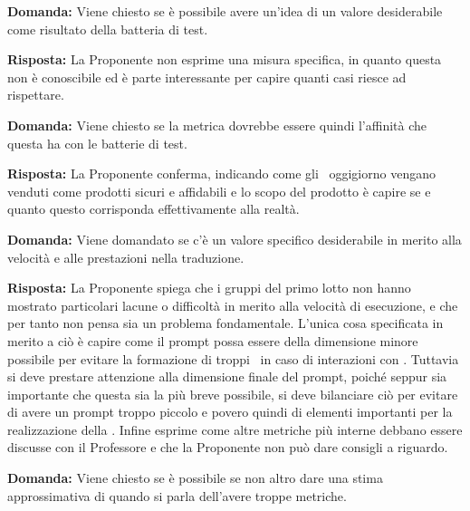 \par \textbf{Domanda:} Viene chiesto se è possibile avere un'idea di un valore desiderabile come risultato della batteria di test.

\par \textbf{Risposta:} La Proponente non esprime una misura specifica, in quanto questa non è conoscibile ed è parte interessante per capire quanti casi riesce ad rispettare.

\par \textbf{Domanda:} Viene chiesto se la metrica dovrebbe essere quindi l'affinità che questa ha con le batterie di test.

\par \textbf{Risposta:} La Proponente conferma, indicando come gli \ oggigiorno vengano venduti come prodotti sicuri e affidabili e lo scopo del prodotto è capire se e quanto questo corrisponda effettivamente alla realtà.

\par \textbf{Domanda:} Viene domandato se c'è un valore specifico desiderabile in merito alla velocità e alle prestazioni nella traduzione.

\par \textbf{Risposta:} La Proponente spiega che i gruppi del primo lotto non hanno mostrato particolari lacune o difficoltà in merito alla velocità di esecuzione, e che per tanto non pensa sia un problema fondamentale.
L'unica cosa specificata in merito a ciò è capire come il prompt possa essere della dimensione minore possibile per evitare la formazione di troppi \ in caso di interazioni con .
Tuttavia si deve prestare attenzione alla dimensione finale del prompt, poiché seppur sia importante che questa sia la più breve possibile, si deve bilanciare ciò per evitare di avere un prompt troppo piccolo e povero quindi di elementi importanti per la realizzazione della .
Infine esprime come altre metriche più interne debbano essere discusse con il Professore e che la Proponente non può dare consigli a riguardo.

\par \textbf{Domanda:} Viene chiesto se è possibile se non altro dare una stima approssimativa di quando si parla dell'avere troppe metriche.

